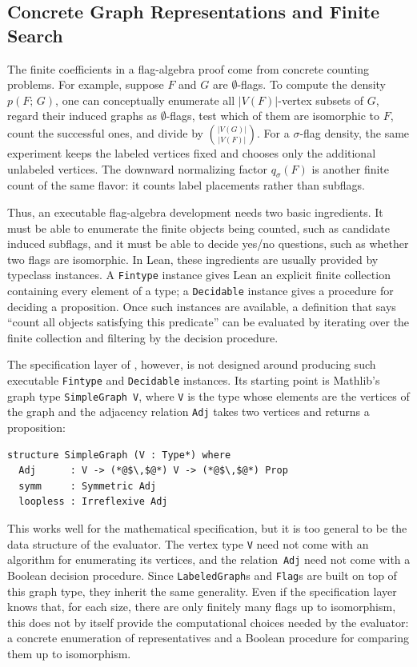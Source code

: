 \documentclass{article}
\newcommand{\den}[2]{p(#1;\,#2)}
\newcommand{\lean}[1]{\texttt{#1}}
\begin{document}
\subsection{Concrete Graph Representations and Finite Search}
\label{sec:reflection-concrete}

The finite coefficients in a flag-algebra proof come from concrete counting
problems.  For example, suppose \(F\) and \(G\) are \(\emptyset\)-flags.  To
compute the density \(\den{F}{G}\), one can conceptually enumerate all
\(|V(F)|\)-vertex subsets of \(G\), regard their induced graphs as
\(\emptyset\)-flags, test which of them are isomorphic to \(F\), count the
successful ones, and divide by
\(\binom{|V(G)|}{|V(F)|}\).  For a \(\sigma\)-flag density, the same experiment
keeps the labeled vertices fixed and chooses only the additional unlabeled
vertices.  The downward normalizing factor \(q_\sigma(F)\) is another finite
count of the same flavor: it counts label placements rather than subflags.

Thus, an executable flag-algebra development needs two basic ingredients.  It
must be able to enumerate the finite objects being counted, such as candidate
induced subflags, and it must be able to decide yes/no questions, such
as whether two flags are isomorphic.  In Lean, these ingredients are usually
provided by typeclass instances.  A \lean{Fintype} instance gives Lean an
explicit finite collection containing every element of a type; a
\lean{Decidable} instance gives a procedure for deciding a proposition.  Once
such instances are available, a definition that says ``count all objects
satisfying this predicate'' can be evaluated by iterating over the finite
collection and filtering by the decision procedure.

The specification layer of , however, is not designed
around producing such executable \lean{Fintype} and \lean{Decidable} instances.
Its starting point is Mathlib's graph type \lean{SimpleGraph V}, where
\lean{V} is the type whose elements are the vertices of the graph and the
adjacency relation \lean{Adj} takes two vertices and returns a proposition:
\begin{lstlisting}
structure SimpleGraph (V : Type*) where
  Adj      : V -> (*@$\,$@*) V -> (*@$\,$@*) Prop
  symm     : Symmetric Adj
  loopless : Irreflexive Adj
\end{lstlisting}
This works well for the mathematical specification, but it is too general to be
the data structure of the evaluator.  The vertex type \lean{V} need not come
with an algorithm for enumerating its vertices, and the relation~\lean{Adj} need
not come with a Boolean decision procedure.  Since \lean{LabeledGraph}s and
\lean{Flag}s are built on top of this graph type, they inherit the same
generality.  Even if the specification layer knows that, for each size, there are
only finitely many flags up to isomorphism, this does not by itself provide the
computational choices needed by the evaluator: a concrete enumeration of
representatives and a Boolean procedure for comparing them up to isomorphism.
\end{document}
